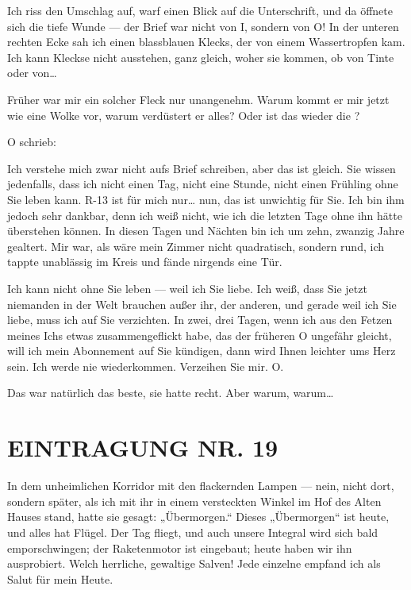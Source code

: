 Ich riss
den Umschlag auf, warf einen Blick auf die Unterschrift, und da
öffnete sich die tiefe Wunde — der Brief war nicht von I, sondern
von O! In der unteren rechten Ecke sah ich einen blassblauen
Klecks, der von einem Wassertropfen kam. Ich kann Kleckse nicht
ausstehen, ganz gleich, woher sie kommen, ob von Tinte oder von\ldots{}

Früher war mir ein solcher Fleck nur unangenehm. Warum kommt er mir
jetzt wie eine Wolke vor, warum verdüstert er alles? Oder ist das
wieder die ?

O schrieb:

\begin{brief}
Ich verstehe mich zwar nicht aufs Brief schreiben, aber das ist
gleich. Sie wissen jedenfalls, dass ich nicht einen Tag, nicht eine
Stunde, nicht einen Frühling ohne Sie leben kann. R-13 ist für mich
nur\ldots{} nun, das ist unwichtig für Sie. Ich bin ihm jedoch sehr
dankbar, denn ich weiß nicht, wie ich die letzten Tage ohne ihn
hätte überstehen können. In diesen Tagen und Nächten bin ich um
zehn, zwanzig Jahre gealtert. Mir war, als wäre mein Zimmer nicht
quadratisch, sondern rund, ich tappte unablässig im Kreis und fände
nirgends eine Tür.

Ich kann nicht ohne Sie leben — weil ich Sie liebe. Ich weiß, dass
Sie jetzt niemanden in der Welt brauchen außer ihr, der anderen,
und gerade weil ich Sie liebe, muss ich auf Sie verzichten. In
zwei, drei Tagen, wenn ich aus den Fetzen meines Ichs etwas
zusammengeflickt habe, das der früheren O ungefähr gleicht, will
ich mein Abonnement auf Sie kündigen, dann wird Ihnen leichter ums
Herz sein. Ich werde nie wiederkommen. Verzeihen Sie mir. O.
\end{brief}

Das war natürlich das beste, sie hatte recht. Aber warum, warum\ldots{}

\section{EINTRAGUNG NR. 19}

In dem unheimlichen Korridor mit den flackernden Lampen — nein,
nicht dort, sondern später, als ich mit ihr in einem versteckten
Winkel im Hof des Alten Hauses stand, hatte sie gesagt:
„Übermorgen.“ Dieses „Übermorgen“ ist heute, und alles hat Flügel.
Der Tag fliegt, und auch unsere Integral wird sich bald
emporschwingen; der Raketenmotor ist eingebaut; heute haben wir ihn
ausprobiert. Welch herrliche, gewaltige Salven! Jede einzelne
empfand ich als Salut für mein Heute.

